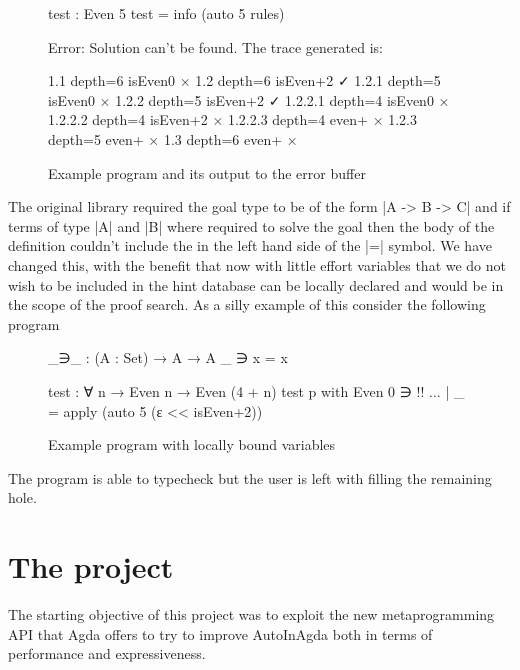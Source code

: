 \documentclass[a4paper]{article}
\begin{document}
\begin{figure}[h]
\noindent\begin{minipage}{.40\textwidth}
\scriptsize
\begin{code}
  test : Even 5
  test = info (auto 5 rules)
\end{code}
\end{minipage}
\begin{minipage}{.55\textwidth}
\scriptsize
\begin{code}
Error: Solution can't be found. The trace generated is:

1.1 depth=6 isEven0 ×
1.2 depth=6 isEven+2 ✓
1.2.1 depth=5 isEven0 ×
1.2.2 depth=5 isEven+2 ✓
1.2.2.1 depth=4 isEven0 ×
1.2.2.2 depth=4 isEven+2 ×
1.2.2.3 depth=4 even+ ×
1.2.3 depth=5 even+ ×
1.3 depth=6 even+ ×
\end{code}
\end{minipage}
  \caption{Example program and its output to the error buffer}
\end{figure}

The original library required the goal type to be of the form |A -> B -> C|
and if terms of type |A| and |B| where required to solve the goal then the body
of the definition couldn't include the in the left hand side of the |=| symbol.
We have changed this, with the benefit that now with little effort
variables that we do not wish to be included in the hint database can be locally
declared and would be in the scope of the proof search. As a silly example of
this consider the following program

\begin{figure}[h]
\scriptsize
\begin{code}
  _∋_ : (A : Set) → A → A
  _ ∋ x = x

  test : ∀ {n} → Even n → Even (4 + n)
  test p with Even 0 ∋ {!!}
  ... | _ = apply (auto 5 (ε << isEven+2))
\end{code}
  \caption{Example program with locally bound variables}
\end{figure}

\noindent
The program is able to typecheck but the user is left with filling the remaining
hole.

\section{The project}
\label{sec:project}

The starting objective of this project was to exploit the new metaprogramming API
that Agda offers to try to improve AutoInAgda both in terms of performance and
expressiveness.
\end{document}

